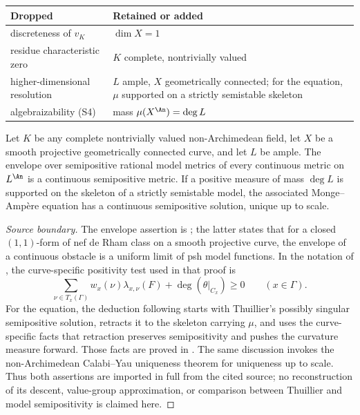 \begin{center}
\small
\begin{tabular}{p{}|p{}}
\toprule
\textbf{Dropped}&\textbf{Retained or added}\\
\midrule
discreteness of $v_K$
 &$\dim X=1$\\
residue characteristic zero
 &$K$ complete, nontrivially valued\\
higher-dimensional resolution
 &$L$ ample, $X$ geometrically connected; for the equation,
  $\mu$ supported on a strictly semistable skeleton\\
algebraizability \textup{(S4)}
 &mass $\mu(X^{\An})=\deg L$\\
\bottomrule
\end{tabular}
\end{center}

\begin{theorem}\label{thm:curves-arbitrary-field-continuity}
Let $K$ be any complete nontrivially valued non-Archimedean field, let
$X$ be a smooth projective geometrically connected curve, and let
$L$ be ample.  The envelope over semipositive rational model metrics
of every continuous metric on $L^{\An}$ is a
continuous semipositive metric.  If a positive measure of mass $\deg L$
is supported on the skeleton of a strictly semistable model, the associated
Monge--Amp\`ere equation has a continuous semipositive solution, unique up
to scale.
\end{theorem}
\begin{proof}[Source boundary]
The envelope assertion is \cite[Theorems~1.1 and~3.1]{GJKM19}; the latter
states that for a closed $(1,1)$-form of nef de Rham class on a smooth
projective curve, the envelope of a continuous obstacle is a uniform limit
of psh model functions.  In the notation of
\cite[Proposition~3.7]{GJKM19}, the curve-specific positivity test used in
that proof is
\begin{equation}
\label{eq:curve-slope-criterion}
 \sum_{\nu\in T_x(\Gamma)}
   w_x(\nu)\lambda_{x,\nu}(F)+\deg(\theta|_{C_x})\geq0
 \qquad(x\in\Gamma).
\end{equation}
For the equation, the deduction following
\cite[Proposition~1.2]{GJKM19} starts with Thuillier's possibly singular
semipositive solution, retracts it to the skeleton carrying $\mu$, and uses
the curve-specific facts that retraction preserves semipositivity and
pushes the curvature measure forward.  Those facts are proved in
\cite[Propositions~3.5 and~3.8]{GJKM19}.  The same discussion invokes the
non-Archimedean Calabi--Yau uniqueness theorem for uniqueness up to scale.
Thus both assertions are imported in full from the cited source; no
reconstruction of its descent, value-group approximation, or comparison
between Thuillier and model semipositivity is claimed here.
\end{proof}

